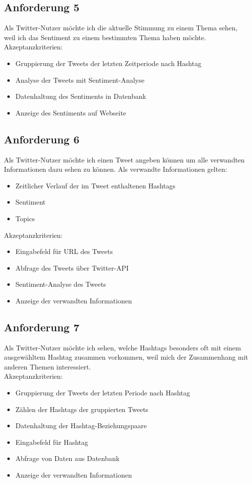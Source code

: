 \documentclass[conference]{IEEEtran}
\begin{document}
\subsection*{Anforderung 5}
Als Twitter-Nutzer möchte ich die aktuelle Stimmung zu einem Thema sehen,
weil ich das Sentiment zu einem bestimmten Thema haben möchte.
\\
Akzeptanzkriterien:
\begin{itemize}
        \item Gruppierung der Tweets der letzten Zeitperiode nach Hashtag
        \item Analyse der Tweets mit Sentiment-Analyse
        \item Datenhaltung des Sentiments in Datenbank
        \item Anzeige des Sentiments auf Webseite
\end{itemize}

\subsection*{Anforderung 6}
Als Twitter-Nutzer möchte ich einen Tweet angeben können um alle verwandten Informationen dazu sehen zu können.
Als verwandte Informationen gelten:
\begin{itemize}
        \item Zeitlicher Verlauf der im Tweet enthaltenen Hashtags
        \item Sentiment
        \item Topics
\end{itemize}
Akzeptanzkriterien:
\begin{itemize}
        \item Eingabefeld für URL des Tweets
        \item Abfrage des Tweets über Twitter-API
        \item Sentiment-Analyse des Tweets
        \item Anzeige der verwandten Informationen
\end{itemize}

\subsection*{Anforderung 7}
Als Twitter-Nutzer möchte ich sehen,
welche Hashtags besonders oft mit einem ausgewähltem Hashtag zusammen vorkommen,
weil mich der Zusammenhang mit anderen Themen interessiert.
\\
Akzeptanzkriterien:
\begin{itemize}
        \item Gruppierung der Tweets der letzten Periode nach Hashtag
        \item Zählen der Hashtags der gruppierten Tweets
        \item Datenhaltung der Hashtag-Beziehungspaare
        \item Eingabefeld für Hashtag
        \item Abfrage von Daten aus Datenbank
        \item Anzeige der verwandten Informationen
\end{itemize}
\end{document}
